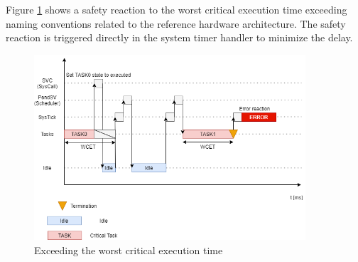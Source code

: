 Figure \ref{fig:SafetyReactionScheduling} shows a safety reaction to the worst critical execution time exceeding naming conventions related to the reference hardware architecture. The safety reaction is triggered directly in the system timer handler to minimize the delay.\\

\begin{figure}[H]
\begin{center}
\includegraphics[width=0.9\textwidth]{images/taskWrapper.png}
\caption{Exceeding the worst critical execution time}
\label{fig:SafetyReactionScheduling}
\end{center}
\end{figure}

